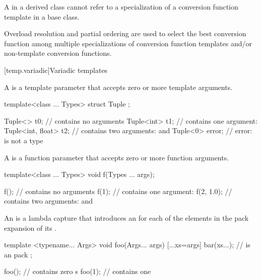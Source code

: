 \pnum
A  in a derived class cannot refer to a specialization
of a
conversion function template
in a base class.

\pnum
Overload resolution and partial
ordering are used to select the best conversion function
among multiple
specializations of conversion function templates
and/or non-template
conversion functions.

[temp.variadic]{Variadic templates}

\pnum
A  is a template parameter
that accepts zero or more template arguments.
\begin{example}
\begin{codeblock}
template<class ... Types> struct Tuple { };

Tuple<> t0;                     //  contains no arguments
Tuple<int> t1;                  //  contains one argument: 
Tuple<int, float> t2;           //  contains two arguments:  and 
Tuple<0> error;                 // error:  is not a type
\end{codeblock}
\end{example}

\pnum
A  is a function parameter
that accepts zero or more function arguments.
\begin{example}
\begin{codeblock}
template<class ... Types> void f(Types ... args);

f();                            //  contains no arguments
f(1);                           //  contains one argument: 
f(2, 1.0);                      //  contains two arguments:  and 
\end{codeblock}
\end{example}

\pnum
An 
is a lambda capture that introduces an 
for each of the elements in the pack expansion of its .
\begin{example}
\begin{codeblock}
template <typename... Args>
void foo(Args... args) {
    [...xs=args]{
        bar(xs...);             //  is an  pack
    };
}

foo();                          //  contains zero s
foo(1);                         //  contains one 
\end{codeblock}
\end{example}

